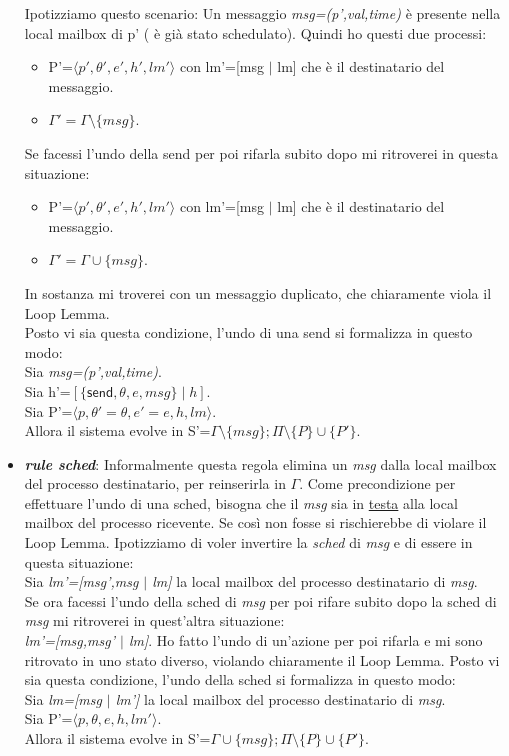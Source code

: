 \documentclass[background.tex]{subfiles}
\begin{document}
\begin{itemize}
		Ipotizziamo questo scenario:
		Un messaggio \textit{msg=(p',val,time)} è presente nella local mailbox di p' ( è già stato schedulato). Quindi ho questi due processi:
			\begin{itemize}
				\item P'=$\displaystyle \langle p',\theta',e',h',lm'\rangle$ con lm'=[msg  $\mid$ lm] che è il destinatario del messaggio.
				\item $\displaystyle \Gamma'=\Gamma\setminus\{msg\}$.
			\end{itemize}
		Se facessi l'undo della send per poi rifarla subito dopo mi ritroverei in questa situazione:
			\begin{itemize}
				\item P'=$\displaystyle \langle p',\theta',e',h',lm'\rangle$ con lm'=[msg  $\mid$ lm] che è il destinatario del messaggio.
				\item $\displaystyle \Gamma'=\Gamma\cup\{msg\}$.
			\end{itemize}
		In sostanza mi troverei con un messaggio duplicato, che chiaramente viola il Loop Lemma.\\
		Posto vi sia questa condizione, l'undo di una send si formalizza in questo modo:\\
		Sia \textit{msg=(p',val,time)}.\\
		Sia h'=$\displaystyle [\{\mathsf{send},\theta,e,msg\} \mid h]$.\\
		Sia P'=$\displaystyle \langle p,\theta'=\theta,e'=e,h,lm \rangle$.\\
		Allora il sistema evolve in S'=$\displaystyle \Gamma\setminus\{msg\};\Pi\setminus\{P\}\cup\{P'\}$.
		\item \textit{\textbf{rule sched}}: Informalmente questa regola elimina un \textit{msg} dalla local mailbox del processo destinatario, per reinserirla in $\Gamma$.
		Come precondizione per effettuare l'undo di una sched, bisogna che il \textit{msg} sia in \underline{testa} alla local mailbox del processo ricevente. Se così non fosse si rischierebbe di violare il Loop Lemma.
		Ipotizziamo di voler invertire la \textit{sched} di \textit{msg} e di essere in questa situazione:\\
		Sia \textit{lm'=[msg',msg $\mid$ lm]} la local mailbox del processo destinatario di \textit{msg}.\\
		Se ora facessi l'undo della sched di \textit{msg} per poi rifare subito dopo la sched di \textit{msg} mi ritroverei in quest'altra situazione:\\
		\textit{lm'=[msg,msg' $\mid$ lm]}.
		Ho fatto l'undo di un'azione per poi rifarla e mi sono ritrovato in uno stato diverso, violando chiaramente il Loop Lemma.
		Posto vi sia questa condizione, l'undo della sched si formalizza in questo modo:\\
		Sia \textit{lm=[msg $\mid$ lm']} la local mailbox del processo destinatario di \textit{msg}.\\
		Sia P'=$\displaystyle \langle p,\theta,e,h,lm' \rangle$.\\
		Allora il sistema evolve in S'=$\displaystyle \Gamma\cup\{msg\};\Pi\setminus\{P\}\cup\{P'\}$.
	\end{itemize}
\end{document}
